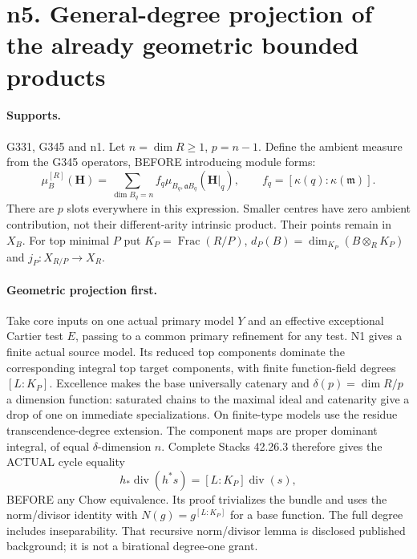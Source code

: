 \documentclass[11pt]{article}
\begin{document}
\section{n5. General-degree projection of the already geometric bounded products}
\paragraph{Supports.} G331, G345 and n1.
Let $n=\dim R\ge1$, $p=n-1$. Define the ambient measure from the G345 operators, BEFORE introducing module forms:
\[
 \mu_B^{[R]}(\boldsymbol H)=\sum_{\dim B_q=n} f_q\mu_{B_q,\mathfrak aB_q}(\boldsymbol H|_q),
 \qquad f_q=[\kappa(q):\kappa(\mathfrak m)].
\]
There are $p$ slots everywhere in this expression. Smaller centres have zero ambient contribution, not their different-arity intrinsic product. Their points remain in $X_B$. For top minimal $P$ put $K_P=\operatorname{Frac}(R/P)$, $d_P(B)=\dim_{K_P}(B\otimes_RK_P)$ and $j_P:X_{R/P}\to X_R$.

\paragraph{Geometric projection first.}
Take core inputs on one actual primary model $Y$ and an effective exceptional Cartier test $E$, passing to a common primary refinement for any test. N1 gives a finite actual source model. Its reduced top components dominate the corresponding integral top target components, with finite function-field degrees $[L:K_P]$. Excellence makes the base universally catenary and $\delta(p)=\dim R/p$ a dimension function: saturated chains to the maximal ideal and catenarity give a drop of one on immediate specializations. On finite-type models use the residue transcendence-degree extension. The component maps are proper dominant integral, of equal $\delta$-dimension $n$. Complete Stacks 42.26.3 therefore gives the ACTUAL cycle equality
\[
 h_*\operatorname{div}(h^*s)=[L:K_P]\operatorname{div}(s), \tag{7}
\]
BEFORE any Chow equivalence. Its proof trivializes the bundle and uses the norm/divisor identity with $N(g)=g^{[L:K_P]}$ for a base function. The full degree includes inseparability. That recursive norm/divisor lemma is disclosed published background; it is not a birational degree-one grant.
\end{document}
